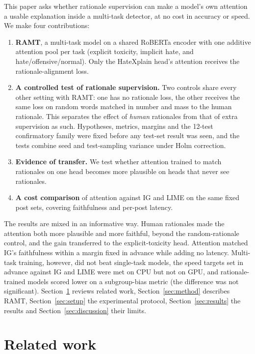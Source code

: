 \documentclass[preprint,12pt,authoryear]{elsarticle}
\begin{document}
This paper asks whether rationale supervision can make a model's own attention a usable explanation inside a multi-task detector, at no cost in accuracy or speed. We make four contributions:
\begin{enumerate}
\item \textbf{RAMT}, a multi-task model on a shared RoBERTa encoder \citep{liu2019roberta} with one additive attention pool per task (explicit toxicity, implicit hate, and hate/offensive/normal). Only the HateXplain head's attention receives the rationale-alignment loss.
\item \textbf{A controlled test of rationale supervision.} Two controls share every other setting with RAMT: one has no rationale loss, the other receives the same loss on random words matched in number and mass to the human rationale. This separates the effect of \emph{human} rationales from that of extra supervision as such. Hypotheses, metrics, margins and the 12-test confirmatory family were fixed before any test-set result was seen, and the tests combine seed and test-sampling variance under Holm correction.
\item \textbf{Evidence of transfer.} We test whether attention trained to match rationales on one head becomes more plausible on heads that never see rationales.
\item \textbf{A cost comparison} of attention against IG and LIME on the same fixed post sets, covering faithfulness and per-post latency.
\end{enumerate}

The results are mixed in an informative way. Human rationales made the attention both more plausible and more faithful, beyond the random-rationale control, and the gain transferred to the explicit-toxicity head. Attention matched IG's faithfulness within a margin fixed in advance while adding no latency. Multi-task training, however, did not beat single-task models, the speed targets set in advance against IG and LIME were met on CPU but not on GPU, and rationale-trained models scored lower on a subgroup-bias metric (the difference was not significant). Section~\ref{sec:related} reviews related work, Section~\ref{sec:method} describes RAMT, Section~\ref{sec:setup} the experimental protocol, Section~\ref{sec:results} the results and Section~\ref{sec:discussion} their limits.

\section{Related work}
\label{sec:related}
\end{document}
